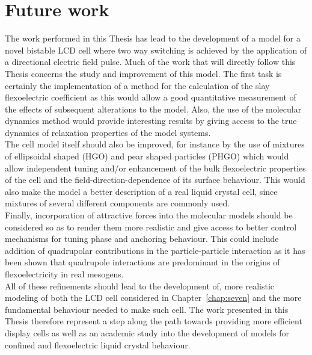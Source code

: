 

\section{Future work}


The work performed in this Thesis has lead to the development of a model for a novel bistable
LCD cell where two way switching is achieved by the application of a directional
electric field pulse. Much of the work that will directly follow this Thesis concerns the study and
improvement of this model. The first task is certainly the implementation of a method
for the calculation of the slay flexoelectric coefficient as this would allow a good quantitative
measurement of the effects of subsequent alterations to the model. Also, the use of the
molecular dynamics method would provide interesting results by giving access to the true 
dynamics of relaxation properties of the model systems.\\
%
The cell model itself should also be improved, for instance by the use of mixtures of ellipsoidal
shaped (HGO) and pear shaped particles (PHGO) which would allow independent tuning and/or
enhancement of the bulk
flexoelectric properties of the cell and the field-direction-dependence of its surface 
behaviour. This would also make the model a better description of a real liquid crystal cell,
since mixtures of several different components are commonly used.\\
Finally, incorporation of attractive forces into the molecular models should be
considered so as to render them more realistic and give access to better control mechanisms for
tuning phase and anchoring behaviour. This could include addition of quadrupolar contributions 
in the particle-particle interaction as it has been shown that quadrupole interactions are 
predominant in the origins of flexoelectricity in real mesogens.\\
All of these refinements should lead to the development of, more realistic modeling of both the
LCD cell considered in Chapter~\ref{chap:seven} and the more fundamental behaviour needed to
make such cell. The work presented in this Thesis therefore represent a step along the path
towards providing more efficient display cells as well as an academic study into the development
of models for confined and flexoelectric liquid crystal behaviour.

